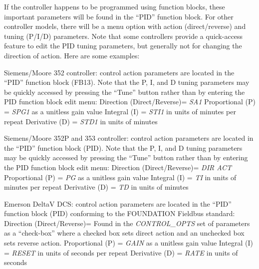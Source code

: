 \vskip 10pt

If the controller happens to be programmed using function blocks, these important parameters will be found in the ``PID'' function block.  For other controller models, there will be a menu option with action (direct/reverse) and tuning (P/I/D) parameters.  Note that some controllers provide a quick-access feature to edit the PID tuning parameters, but generally not for changing the direction of action.  Here are some examples:

\vskip 10pt

\item{} Siemens/Moore 352 controller: control action parameters are located in the ``PID'' function block (FB13).  Note that the P, I, and D tuning parameters may be quickly accessed by pressing the ``Tune'' button rather than by entering the PID function block edit menu:
\itemitem{} Direction (Direct/Reverse)= {\it SA1}
\itemitem{} Proportional (P) = {\it SPG1} as a unitless gain value
\itemitem{} Integral (I) = {\it STI1} in units of minutes per repeat
\itemitem{} Derivative (D) = {\it STD1} in units of minutes
\vskip 10pt
\item{} Siemens/Moore 352P and 353 controller: control action parameters are located in the ``PID'' function block (PID).  Note that the P, I, and D tuning parameters may be quickly accessed by pressing the ``Tune'' button rather than by entering the PID function block edit menu:
\itemitem{} Direction (Direct/Reverse)= {\it DIR ACT}
\itemitem{} Proportional (P) = {\it PG} as a unitless gain value
\itemitem{} Integral (I) = {\it TI} in units of minutes per repeat
\itemitem{} Derivative (D) = {\it TD} in units of minutes
\vskip 10pt
\item{} Emerson DeltaV DCS: control action parameters are located in the ``PID'' function block (PID) conforming to the FOUNDATION Fieldbus standard:
\itemitem{} Direction (Direct/Reverse)= Found in the {\it CONTROL\_OPTS} set of parameters as a ``check-box'' where a checked box sets direct action and an unchecked box sets reverse action.
\itemitem{} Proportional (P) = {\it GAIN} as a unitless gain value
\itemitem{} Integral (I) = {\it RESET} in units of seconds per repeat
\itemitem{} Derivative (D) = {\it RATE} in units of seconds
\vskip 10pt
